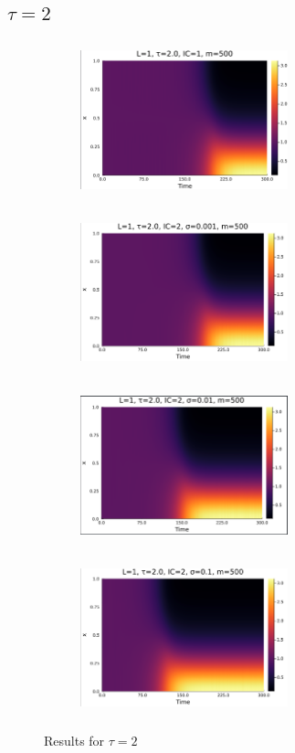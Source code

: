 \documentclass[12pt,a4paper]{article}
\begin{document}
\subsection{$\tau=2$}
\begin{figure}[H]
    \centering
    \begin{subfigure}[b]{0.45\linewidth}
        \centering
        \includegraphics[width=6cm,height = 4.5cm]{l1t2ic1.png}
        \caption{}
        \label{}
    \end{subfigure}
    \hfill
    \begin{subfigure}[b]{0.45\linewidth}
        \centering
        \includegraphics[width=6cm,height = 4.5cm]{l1t2ic2s1e3.png}
        \caption{}
        \label{}
    \end{subfigure}
    \hfill
    \begin{subfigure}[b]{0.45\linewidth}
        \centering
        \includegraphics[width=6cm,height = 4.5cm]{l1t2ic2s1e2.png}
        \caption{}
        \label{}
    \end{subfigure}
    \hfill
    \begin{subfigure}[b]{0.45\linewidth}
        \centering
        \includegraphics[width=6cm,height = 4.5cm]{l1t2ic2s1e1.png}
        \caption{}
        \label{}
    \end{subfigure}
    \caption{Results for $\tau=2$}
    \label{}
\end{figure}
\end{document}
